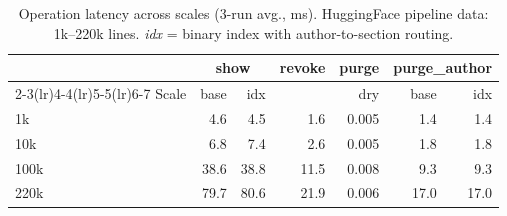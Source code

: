 \begin{table}[t]
	\centering
	\footnotesize
	\caption{Operation latency across scales (3-run avg., ms). HuggingFace pipeline data: 1k--220k lines. \emph{idx} = binary index with author-to-section routing.}
	\label{tab:scalability}
	\setlength{\tabcolsep}{3pt}
	\begin{tabular}{@{}lrrrrrr@{}}
		\toprule
		& \multicolumn{2}{c}{show} & revoke & purge & \multicolumn{2}{c}{purge\_author} \\
		\cmidrule(lr){2-3}\cmidrule(lr){4-4}\cmidrule(lr){5-5}\cmidrule(lr){6-7}
		Scale & base & idx & & dry & base & idx \\
		\midrule
		1k              & 4.6  & 4.5  & 1.6  & 0.005 & 1.4  & 1.4  \\
		10k             & 6.8  & 7.4  & 2.6  & 0.005 & 1.8  & 1.8  \\
		100k            & 38.6 & 38.8 & 11.5 & 0.008 & 9.3  & 9.3  \\
		220k            & 79.7 & 80.6 & 21.9 & 0.006 & 17.0 & 17.0 \\
		\bottomrule
	\end{tabular}
\end{table}
